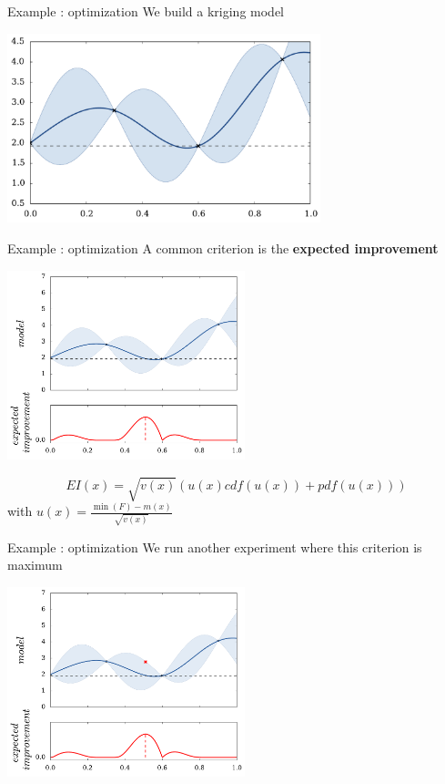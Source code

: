 \documentclass{beamer}
\begin{document}
\begin{frame}{Example : optimization}
We build a kriging model
\begin{center}
\includegraphics[height=5.5cm]{figures/python/ego_modelInit}
\end{center}
\end{frame}

\begin{frame}{Example : optimization}
A common criterion is the \textbf{expected improvement}
\begin{center}
\includegraphics[height=5.5cm]{figures/python/ego_EI0}
\end{center}
$$EI(x) = \sqrt{v(x)} (u(x) cdf(u(x)) + pdf(u(x)))$$
\qquad with $ \displaystyle u(x) = \frac{\min(F) - m(x)}{\sqrt{v(x)}}$
\end{frame}

\begin{frame}{Example : optimization}
We run another experiment where this criterion is maximum\\
\begin{center}
\includegraphics[height=5.5cm]{figures/python/ego_EI0bis}
\end{center}
\end{frame}
\end{document}
